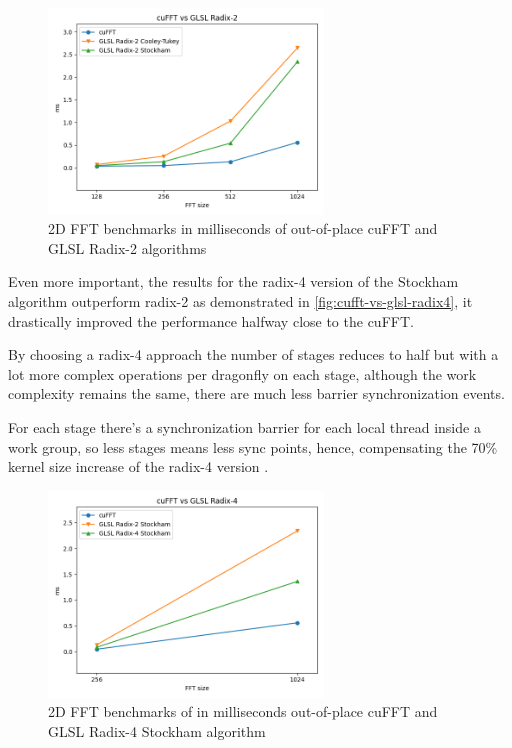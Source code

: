 \documentclass[
  oneside,
  11pt, a4paper,
  footinclude=true,
  headinclude=true,
  cleardoublepage=empty
]{scrbook}
\begin{document}
\begin{figure}[H] 
    \centering
    \includegraphics[width=0.65\textwidth]{img/results/cufft_vs_glsl_radix2.png}
    \caption{2D FFT benchmarks in milliseconds of out-of-place cuFFT and GLSL Radix-2 algorithms}
    \label{fig:cufft-vs-glsl-radix2}
\end{figure}

Even more important, the results for the radix-4 version of the Stockham algorithm outperform radix-2 as demonstrated in \autoref{fig:cufft-vs-glsl-radix4}, it drastically improved the performance halfway close to the cuFFT.

By choosing a radix-4 approach the number of stages reduces to half but with a lot more complex operations per dragonfly on each stage, although the work complexity remains the same, there are much less barrier synchronization events.

For each stage there's a synchronization barrier for each local thread inside a work group, so less stages means less sync points, hence, compensating the 70\% kernel size increase of the radix-4 version .

\begin{figure}[H] 
    \centering
    \includegraphics[width=0.65\textwidth]{img/results/cufft_vs_glsl_radix4.png}
    \caption{2D FFT benchmarks of in milliseconds out-of-place cuFFT and GLSL Radix-4 Stockham algorithm}
    \label{fig:cufft-vs-glsl-radix4}
\end{figure}
\end{document}
